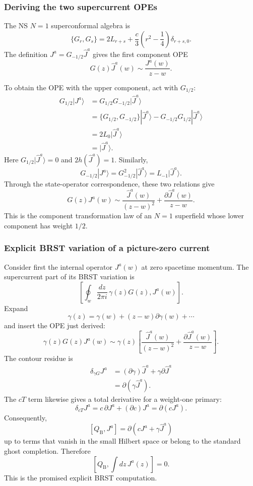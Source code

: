 \documentclass[
  10pt,
  a4paper,
  openany]{book}
\begin{document}
\subsubsection{Deriving the two supercurrent
OPEs}\label{deriving-the-two-supercurrent-opes}

The NS \(N=1\) superconformal algebra is \[
\{G_r,G_s\}
=
2L_{r+s}
+
\frac{c}{3}
\left(r^2-\frac14\right)\delta_{r+s,0}.
\] The definition \(J^a=G_{-1/2}\hat J^a\) gives the first component OPE
\[
\boxed{
G(z)\hat J^a(w)
\sim
\frac{J^a(w)}{z-w}.
}
\]

To obtain the OPE with the upper component, act with \(G_{1/2}\): \[
\begin{aligned}
G_{1/2}|J^a\rangle
&=
G_{1/2}G_{-1/2}|\hat J^a\rangle
\\
&=
\{G_{1/2},G_{-1/2}\}|\hat J^a\rangle
-
G_{-1/2}G_{1/2}|\hat J^a\rangle
\\
&=
2L_0|\hat J^a\rangle
\\
&=
|\hat J^a\rangle.
\end{aligned}
\] Here \(G_{1/2}|\hat J^a\rangle=0\) and \(2h(\hat J^a)=1\). Similarly,
\[
G_{-1/2}|J^a\rangle
=
G_{-1/2}^2|\hat J^a\rangle
=
L_{-1}|\hat J^a\rangle.
\] Through the state-operator correspondence, these two relations give
\[
\boxed{
G(z)J^a(w)
\sim
\frac{\hat J^a(w)}{(z-w)^2}
+
\frac{\partial\hat J^a(w)}{z-w}.
}
\] This is the component transformation law of an \(N=1\) superfield
whose lower component has weight \(1/2\).

\subsubsection{Explicit BRST variation of a picture-zero
current}\label{explicit-brst-variation-of-a-picture-zero-current}

Consider first the internal operator \(J^a(w)\) at zero spacetime
momentum. The supercurrent part of its BRST variation is \[
\left[
\oint_w\frac{dz}{2\pi i}\,
\gamma(z)G(z),
J^a(w)
\right].
\] Expand \[
\gamma(z)
=
\gamma(w)+(z-w)\partial\gamma(w)+\cdots
\] and insert the OPE just derived: \[
\gamma(z)G(z)J^a(w)
\sim
\gamma(z)
\left[
\frac{\hat J^a(w)}{(z-w)^2}
+
\frac{\partial\hat J^a(w)}{z-w}
\right].
\] The contour residue is \[
\begin{aligned}
\delta_{\gamma G}J^a
&=
(\partial\gamma)\hat J^a
+
\gamma\partial\hat J^a
\\
&=
\boxed{
\partial\!\left(\gamma\hat J^a\right).
}
\end{aligned}
\] The \(cT\) term likewise gives a total derivative for a weight-one
primary: \[
\delta_{cT}J^a
=
c\,\partial J^a+(\partial c)J^a
=
\partial(cJ^a).
\] Consequently, \[
[Q_{\mathrm B},J^a]
=
\partial\!\left(cJ^a+\gamma\hat J^a\right)
\] up to terms that vanish in the small Hilbert space or belong to the
standard ghost completion. Therefore \[
\boxed{
\left[
Q_{\mathrm B},
\int dz\,J^a(z)
\right]
=0.
}
\] This is the promised explicit BRST computation.
\end{document}
